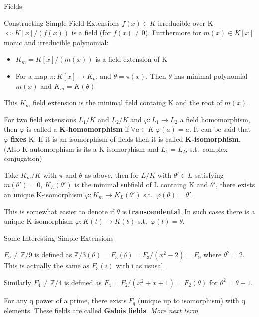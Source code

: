 \documentclass[12pt, letterpaper]{article}
\begin{document}
\begin{section}{Fields}
\begin{subsection}{Constructing Simple Field Extensions}
    \(f(x) \in K\) irreducible over K \(\iff K[x]/(f(x))\) is a field (for
    \(f(x) \neq 0\)). Furthermore for \(m(x) \in K[x]\) monic and irreducible
    polynomial:
    \begin{itemize}
      \item \(K_{m} = K[x] / (m(x))\) is a field extension of K
      \item For a map \(\pi : K[x] \to K_{m}\) and \(\theta = \pi(x)\). Then
            \(\theta\) has minimal polynomial \(m(x)\) and \(K_{m} =
            K(\theta)\)
    \end{itemize}
    This \(K_{m}\) field extension is the minimal field containg K and the root
    of \(m(x)\).

    For two field extensions \(L_{1} / K\) and \(L_{2} / K\) and \(\varphi:
    L_{1} \to L_{2}\) a field homomorphism, then \(\varphi\) is called a
    \textbf{K-homomorphism} if \(\forall a \in K \; \varphi(a) = a\). It can
    be said that \(\varphi\) \textbf{fixes} K. If it is an isomorphism of fields
    then it is called \textbf{K-isomorphism}. (Also K-automorphism is its a
    K-isomorphism and \(L_{1} = L_{2}\), s.t.\ complex conjugation)

    Take \(K_{m} / K\) with \(\pi\) and \(\theta\) as above, then for \(L / K\)
    with \(\theta' \in L\) satisfying \(m(\theta') = 0\), \(K_{L}(\theta')\) is
    the minimal subfield of L containg K and \(\theta'\), there exists an
    unique K-isomorphism \(\varphi: K_{m} \to K_{L}(\theta')\) s.t.\
    \(\varphi(\theta) = \theta'\).

    This is somewhat easier to denote if \(\theta\) is \textbf{transcendental}.
    In such cases there is a unique K-isomorphism \(\varphi: K(t) \to
    K(\theta)\) s.t.\ \(\varphi(t) = \theta\).

  \end{subsection}

  \begin{subsection}{Some Interesting Simple Extensions}

    \(F_{9} \neq \mathbb{Z} / 9\) is defined as \(\mathbb{Z} / 3 (\theta)
    = F_{3}(\theta) = F_{3} / (x^{2} - 2) = F_{9}\) where \(\theta^{2} = 2\).
    This is actually the same as \(F_{3}(i)\) with i as ususal.

    Similarly \(F_{4} \neq \mathbb{Z} / 4\) is defined as
    \(F_{4} = F_{2} / (x^{2} + x + 1) = F_{2}(\theta)\) for \(\theta^{2} =
    \theta + 1\).

    For any q power of a prime, there exists \(F_{q}\) (unique up to
    isomorphism) with q elements. These fields are called \textbf{Galois
      fields}. \textit{More next term}


\end{subsection}
\end{section}
\end{document}
